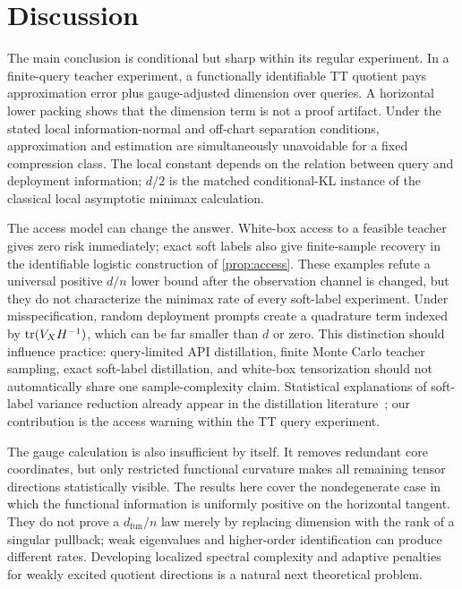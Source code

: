 \section{Discussion}
\label{sec:discussion}

The main conclusion is conditional but sharp within its regular experiment. In a finite-query teacher experiment, a functionally identifiable TT quotient pays approximation error plus gauge-adjusted dimension over queries. A horizontal lower packing shows that the dimension term is not a proof artifact. Under the stated local information-normal and off-chart separation conditions, approximation and estimation are simultaneously unavoidable for a fixed compression class. The local constant depends on the relation between query and deployment information; \(d/2\) is the matched conditional-KL instance of the classical local asymptotic minimax calculation.

The access model can change the answer. White-box access to a feasible teacher gives zero risk immediately; exact soft labels also give finite-sample recovery in the identifiable logistic construction of \cref{prop:access}. These examples refute a universal positive \(d/n\) lower bound after the observation channel is changed, but they do not characterize the minimax rate of every soft-label experiment. Under misspecification, random deployment prompts create a quadrature term indexed by \(\operatorname{tr}(V_XH^{-1})\), which can be far smaller than \(d\) or zero. This distinction should influence practice: query-limited API distillation, finite Monte Carlo teacher sampling, exact soft-label distillation, and white-box tensorization should not automatically share one sample-complexity claim. Statistical explanations of soft-label variance reduction already appear in the distillation literature~\citep{phuong2019distillation,menon2021distillation,xie2026distillation}; our contribution is the access warning within the TT query experiment.

The gauge calculation is also insufficient by itself. It removes redundant core coordinates, but only restricted functional curvature makes all remaining tensor directions statistically visible. The results here cover the nondegenerate case in which the functional information is uniformly positive on the horizontal tangent. They do not prove a \(d_{\mathrm{fun}}/n\) law merely by replacing dimension with the rank of a singular pullback; weak eigenvalues and higher-order identification can produce different rates. Developing localized spectral complexity and adaptive penalties for weakly excited quotient directions is a natural next theoretical problem.

